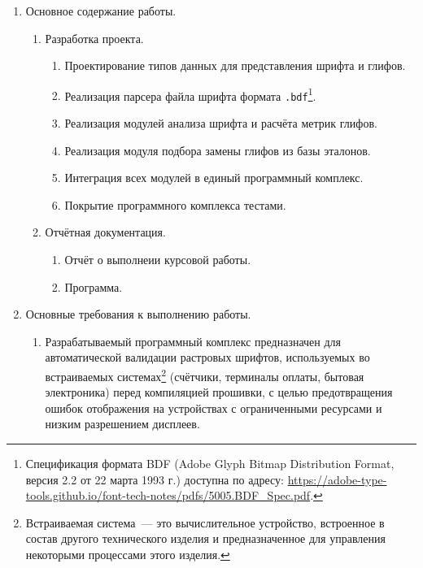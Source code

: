 \begin{enumerate}
\begin{enumerate}[label=\alph*.]
\begin{enumerate}
                \item Обеспечить логирование действий и обработку ошибок ввода.
                \item Покрыть ключевые модули тестами с использованием библиотеки QuickCheck.
                \item Подготовить отчётную документацию.
            \end{enumerate}
            \item Исходными данными для проведения работы являются файлы растровых шрифтов в формате \verb|.bdf|.
        \end{enumerate}
    \item Основное содержание работы.
    \begin{enumerate}[label=\alph*.]
        \item Разработка проекта.
        \begin{enumerate}
            \item Проектирование типов данных для представления шрифта и глифов.
            \item Реализация парсера файла шрифта формата \verb|.bdf|\footnote{Спецификация формата BDF (Adobe Glyph Bitmap Distribution Format, версия 2.2 от 22 марта 1993 г.) доступна по адресу: \url{https://adobe-type-tools.github.io/font-tech-notes/pdfs/5005.BDF_Spec.pdf}.}.
            \item Реализация модулей анализа шрифта и расчёта метрик глифов.
            \item Реализация модуля подбора замены глифов из базы эталонов.
            \item Интеграция всех модулей в единый программный комплекс.
            \item Покрытие программного комплекса тестами.
        \end{enumerate}
        \item Отчётная документация.
        \begin{enumerate}
            \item Отчёт о выполнеии курсовой работы.
            \item Программа.
        \end{enumerate}
    \end{enumerate}
    \item Основные требования к выполнению работы.
    \begin{enumerate}[label=\alph*.]
        \item Разрабатываемый программный комплекс предназначен для автоматической валидации растровых шрифтов, используемых во встраиваемых системах\footnote{Встраиваемая система~--- это вычислительное устройство, встроенное в состав другого технического изделия и предназначенное для управления некоторыми процессами этого изделия.} (счётчики, терминалы оплаты, бытовая электроника) перед компиляцией прошивки, с целью предотвращения ошибок отображения на устройствах с ограниченными ресурсами и низким разрешением дисплеев.

\end{enumerate}
\end{enumerate}
